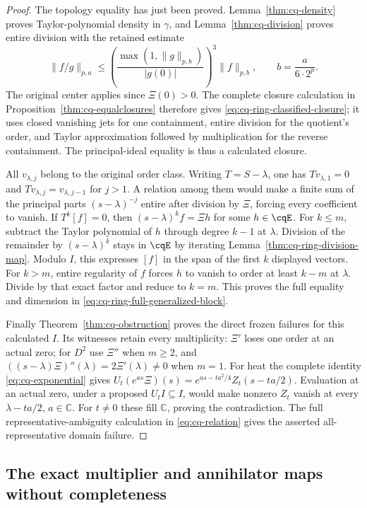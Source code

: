 \begin{proof}
The topology equality has just been proved.
Lemma~\ref{thm:cq-density} proves Taylor-polynomial density
in $\gamma$, and Lemma~\ref{thm:cq-division} proves entire
division with the retained estimate
\[
 \|f/g\|_{p,a}\leq
 \left(\frac{\max(1,\|g\|_{p,b})}{|g(0)|}\right)^3
 \|f\|_{p,b},\qquad b=\frac{a}{6\cdot2^p}.
\]
The original center applies since $\Xi(0)>0$.
The complete closure calculation in
Proposition~\ref{thm:cq-equalclosures} therefore gives
\eqref{eq:cq-ring-classified-closure}; it uses closed
vanishing jets for one containment, entire division for
the quotient's order, and Taylor approximation followed
by multiplication for the reverse containment. The
principal-ideal equality is thus a calculated closure.

All $v_{\lambda,j}$ belong to the original order class.
Writing $T=S-\lambda$, one has $Tv_{\lambda,1}=0$ and
$Tv_{\lambda,j}=v_{\lambda,j-1}$ for $j>1$.
A relation among them would make a finite sum of the
principal parts $(s-\lambda)^{-j}$ entire after division
by $\Xi$, forcing every coefficient to vanish.
If $T^k[f]=0$, then $(s-\lambda)^kf=\Xi h$ for some
$h\in\cqE$. For $k\leq m$, subtract the Taylor polynomial
of $h$ through degree $k-1$ at $\lambda$. Division of the
remainder by $(s-\lambda)^k$ stays in $\cqE$ by iterating
Lemma~\ref{thm:cq-ring-division-map}. Modulo $I$, this
expresses $[f]$ in the span of the first $k$ displayed
vectors. For $k>m$, entire regularity of $f$ forces $h$
to vanish to order at least $k-m$ at $\lambda$. Divide by
that exact factor and reduce to $k=m$. This proves the
full equality and dimension in
\eqref{eq:cq-ring-full-generalized-block}.

Finally Theorem~\ref{thm:cq-obstruction} proves the direct
frozen failures for this calculated $I$. Its witnesses
retain every multiplicity: $\Xi'$ loses one order at
an actual zero; for $D^2$ use $\Xi''$ when $m\geq2$,
and $((s-\lambda)\Xi)''(\lambda)=2\Xi'(\lambda)\ne0$
when $m=1$. For heat the complete identity
\eqref{eq:cq-exponential} gives
$U_t(e^{as}\Xi)(s)=e^{as-ta^2/4}Z_t(s-ta/2)$.
Evaluation at an actual zero, under a proposed
$U_tI\subseteq I$, would make nonzero $Z_t$ vanish
at every $\lambda-ta/2$, $a\in\mathbb C$. For $t\ne0$
these fill $\mathbb C$, proving the contradiction.
The full representative-ambiguity calculation in
\eqref{eq:cq-relation} gives the asserted all-representative
domain failure.
\end{proof}

\subsection{The exact multiplier and annihilator maps without completeness}

